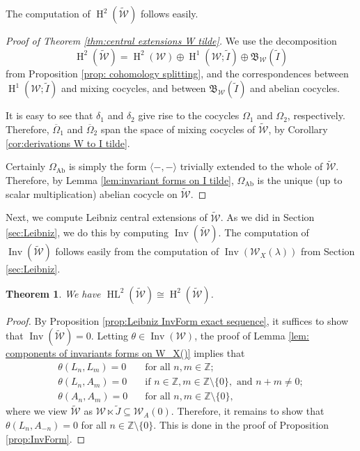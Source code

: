 \documentclass[11pt, svgnames]{amsart}
\DeclareMathOperator{\Inv}{Inv}
\newcommand{\B}{\mathfrak{B}}
\newcommand{\ZZ}{\mathbb{Z}}
\newcommand{\W}{\mathcal{W}}
\DeclareMathOperator{\HH}{H}
\DeclareMathOperator{\HL}{HL}
\DeclareMathOperator{\Ab}{Ab}
\newcommand{\nonzero}{\setminus \{0\}}
\newcommand{\ang}[1]{\langle #1 \rangle}
\newtheorem{theorem}[proposition]{Theorem}
\theoremstyle{definition}
\begin{document}
The computation of $\HH^2(\widetilde{\W})$ follows easily.

\begin{proof}[Proof of Theorem \ref{thm:central extensions W tilde}]
    We use the decomposition
    $$\HH^2(\widetilde{\W}) = \HH^2(\W) \oplus \HH^1(\W;\widetilde{I}) \oplus \B_\W(\widetilde{I})$$
    from Proposition \ref{prop: cohomology splitting}, and the correspondences between $\HH^1(\W;\widetilde{I})$ and mixing cocycles, and between $\B_\W(\widetilde{I})$ and abelian cocycles.

    It is easy to see that $\delta_1$ and $\delta_2$ give rise to the cocycles $\Omega_1$ and $\Omega_2$, respectively. Therefore, $\overline{\Omega}_1$ and $\overline{\Omega}_2$ span the space of mixing cocycles of $\widetilde{\W}$, by Corollary \ref{cor:derivations W to I tilde}.

    Certainly $\Omega_{\Ab}$ is simply the form $\ang{-,-}$ trivially extended to the whole of $\widetilde{\W}$. Therefore, by Lemma \ref{lem:invariant forms on I tilde}, $\Omega_{\Ab}$ is the unique (up to scalar multiplication) abelian cocycle on $\widetilde{\W}$.
\end{proof}

Next, we compute Leibniz central extensions of $\widetilde{\W}$. As we did in Section \ref{sec:Leibniz}, we do this by computing $\Inv(\widetilde{\W})$. The computation of $\Inv(\widetilde{\W})$ follows easily from the computation of $\Inv(\W_X(\lambda))$ from Section \ref{sec:Leibniz}.

\begin{theorem}\label{thm:Leibniz W tilde}
    We have $\HL^2(\widetilde{\W}) \cong \HH^2(\widetilde{\W})$.
\end{theorem}
\begin{proof}
    By Proposition \ref{prop:Leibniz InvForm exact sequence}, it suffices to show that $\Inv(\widetilde{\W}) = 0$. Letting $\theta \in \Inv(\W)$, the proof of Lemma \ref{lem: components of invariants forms on W_X()} implies that
    \begin{align*}
        \theta(L_n, L_m) = 0 \quad &\text{for all } n,m \in \ZZ; \\
        \theta(L_n, A_m) = 0 \quad &\text{if } n \in \ZZ, m \in \ZZ \nonzero, \text{ and } n + m \neq 0; \\
        \theta(A_n, A_m) = 0 \quad &\text{for all } n,m \in \ZZ \nonzero,
    \end{align*}
    where we view $\widetilde{\W}$ as $\W \ltimes \widetilde{J} \subseteq \W_A(0)$. Therefore, it remains to show that $\theta(L_n, A_{-n}) = 0$ for all $n \in \ZZ \nonzero$. This is done in the proof of Proposition \ref{prop:InvForm}.
\end{proof}
\end{document}
